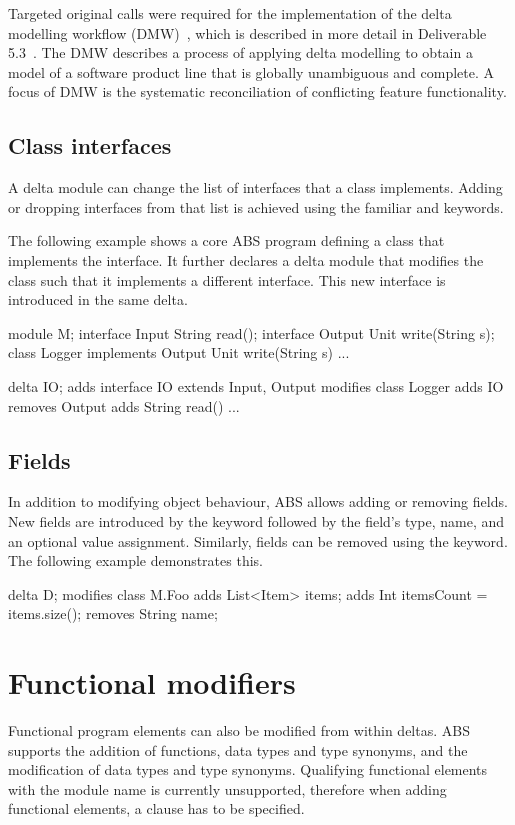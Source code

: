 Targeted original calls were required for the implementation of the delta
modelling workflow (DMW)~\cite{Helvensteijn12,HelvensteijnMW12}, which is
described in more detail in Deliverable 5.3~\cite{d5.3}. The DMW describes a
process of applying delta modelling to obtain a model of a software product line
that is globally unambiguous and complete. A focus of DMW is the systematic
reconciliation of conflicting feature functionality.


\subsection{Class interfaces}
A delta module can change the list of interfaces that a class implements.
Adding or dropping interfaces from that list is achieved using the familiar
 and  keywords.

The following example shows a core ABS program defining a 
class that implements the  interface. It further declares a
delta module that modifies the  class such that it
implements a different interface. This new   interface is 
introduced in the same delta.
%
\begin{abscode}
module M;
interface Input { String read(); }
interface Output { Unit write(String s); }
class Logger implements Output {
    Unit write(String s) {...}
}

delta IO;
adds interface IO extends Input, Output {}
modifies class Logger adds IO removes Output {
    adds String read() {...}
}
\end{abscode}

\subsection{Fields}
In addition to modifying object behaviour, ABS allows adding or removing fields.
New fields are introduced by the  keyword followed by the
field's type, name, and an optional value assignment. Similarly, fields can be
removed using the  keyword. The following example demonstrates this.
\begin{abscode}
delta D;
modifies class M.Foo {
    adds List<Item> items;
    adds Int itemsCount = items.size();
    removes String name;
}
\end{abscode}



\section{Functional modifiers}
Functional program elements can also be modified from within deltas.
ABS supports the addition of functions, data types and type synonyms,
and the modification of data types and type synonyms.  Qualifying
functional elements with the module name is currently unsupported,
therefore when adding functional elements, a  clause has
to be specified.

